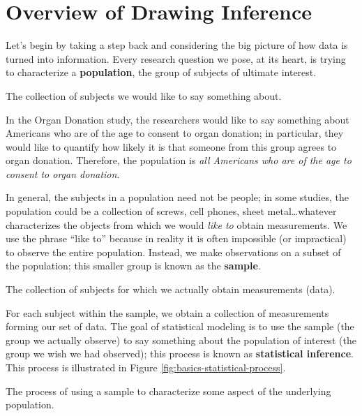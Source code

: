 \documentclass[]{book}
\theoremstyle{plain}
\theoremstyle{mydefn}
\theoremstyle{myexmpl}
\theoremstyle{remark}
\let\BeginKnitrBlock\begin \let\EndKnitrBlock\end
\let\BeginKnitrBlock\begin \let\EndKnitrBlock\end
\begin{document}
\section{Overview of Drawing
Inference}\label{overview-of-drawing-inference}

Let's begin by taking a step back and considering the big picture of how
data is turned into information. Every research question we pose, at its
heart, is trying to characterize a \textbf{population}, the group of
subjects of ultimate interest.

\BeginKnitrBlock{definition}[Population]
\protect\hypertarget{def:defn-population}{}{\label{def:defn-population}
{} }The collection of subjects we would like to
say something about.
\EndKnitrBlock{definition}

In the Organ Donation study, the researchers would like to say something
about Americans who are of the age to consent to organ donation; in
particular, they would like to quantify how likely it is that someone
from this group agrees to organ donation. Therefore, the population is
\emph{all Americans who are of the age to consent to organ donation}.

In general, the subjects in a population need not be people; in some
studies, the population could be a collection of screws, cell phones,
sheet metal\ldots{}whatever characterizes the objects from which we
would \emph{like to} obtain measurements. We use the phrase ``like to''
because in reality it is often impossible (or impractical) to observe
the entire population. Instead, we make observations on a subset of the
population; this smaller group is known as the \textbf{sample}.

\BeginKnitrBlock{definition}[Sample]
\protect\hypertarget{def:defn-sample}{}{\label{def:defn-sample}
{} }The collection of subjects for which we
actually obtain measurements (data).
\EndKnitrBlock{definition}

For each subject within the sample, we obtain a collection of
measurements forming our set of data. The goal of statistical modeling
is to use the sample (the group we actually observe) to say something
about the population of interest (the group we wish we had observed);
this process is known as \textbf{statistical inference}. This process is
illustrated in Figure \ref{fig:basics-statistical-process}.

\BeginKnitrBlock{definition}[Statistical Inference]
\protect\hypertarget{def:defn-inference}{}{\label{def:defn-inference}
{} }The process of using a sample to
characterize some aspect of the underlying population.
\EndKnitrBlock{definition}
\end{document}
